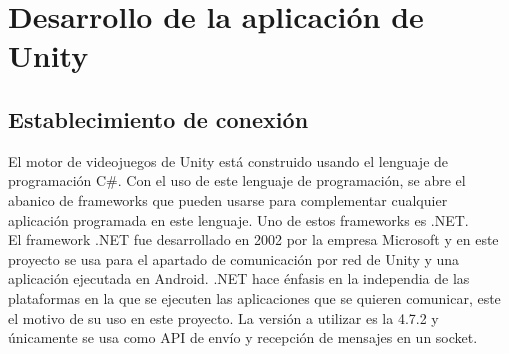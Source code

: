 %
%
%
%
%
%
%
%
%
%

\chapter{Desarrollo de la aplicaci\'on de Unity}
\label{cap6}
\label{cap:discusion}



\begin{resumen}

\end{resumen}

\section{Establecimiento de conexi\'on}
\label{cap6:sec:conexion}

El motor de videojuegos de Unity est\'a construido usando el lenguaje de programaci\'on C\#. Con el uso de este lenguaje de programaci\'on, se abre el abanico de frameworks que pueden usarse para complementar cualquier aplicaci\'on programada en este lenguaje. Uno de estos frameworks es .NET.
\\
 El framework .NET fue desarrollado en 2002 por la empresa Microsoft y en este proyecto se usa para el apartado de comunicaci\'on por red de Unity y una aplicaci\'on ejecutada en Android. .NET hace \'enfasis en la independia de las plataformas en la que se ejecuten las aplicaciones que se quieren comunicar, este el motivo de su uso en este proyecto. La versi\'on a utilizar es la 4.7.2 y \'unicamente se usa como API de env\'io y recepci\'on de mensajes en un socket. 
\\

